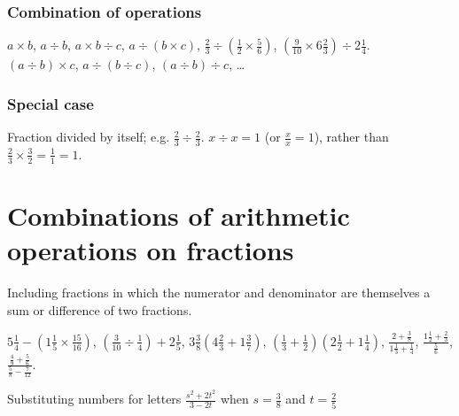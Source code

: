 \documentclass{article}
\begin{document}
\subsubsection{Combination of operations}

\(a \times b\), \(a \div b\), \(a \times b \div c\), \(a \div (b \times c)\), \hfill \(\frac{2}{3} \div \left(\frac{1}{2} \times \frac{5}{6} \right)\), \(\left(\frac{9}{10} \times 6\frac{2}{3} \right) \div 2 \frac{1}{4}\).  \\
\((a \div b) \times c\), \(a \div (b \div c)\), \((a \div b) \div c\), \ldots

\subsubsection{Special case}

Fraction divided by itself; e.g. \(\frac{2}{3} \div \frac{2}{3}\).  \(x \div x = 1\) (or \(\frac{x}{x} = 1\)), rather than \(\frac{2}{3} \times \frac{3}{2} = \frac{1}{1} = 1\).

\section{Combinations of arithmetic operations on fractions}

Including fractions in which the numerator and denominator are themselves a sum or difference of two fractions.

\(5\frac{1}{4} - \left(1\frac{1}{5} \times \frac{15}{16} \right) \), \(\left( \frac{3}{10} \div \frac{1}{4} \right)  + 2 \frac{1}{5}\),
\(3\frac{3}{8} \left(  4 \frac{2}{3} + 1\frac{3}{7}\right) \), \(\left( \frac{1}{3} + \frac{1}{2}\right)  \left(  2\frac{1}{2} + 1 \frac{1}{4} \right) \),
\(\frac{2+\frac{3}{8}}{1\frac{1}{3}+\frac{1}{4}}\), \(\frac{1\frac{1}{2}+\frac{2}{3}}{\frac{5}{6}}\), \(\frac{\frac{4}{9} + \frac{5}{6}}{\frac{5}{8} - \frac{7}{12}}\).



Substituting numbers for letters \hfill \(\frac{s^2 + 2t^2}{3 - 2t}\) when \(s = \frac{3}{8}\) and \(t = \frac{2}{5}\)
\end{document}
